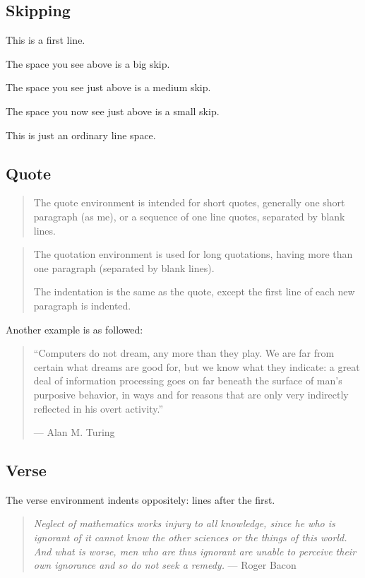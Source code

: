 \documentclass{article}
\begin{document}
\subsection{Skipping}
This is a first line. \bigskip

The space you see above is a big skip. \medskip

The space you see just above is a medium skip. \smallskip

The space you now see just above is a small skip.

This is just an ordinary line space.

\subsection{Quote}
\begin{quote}
The quote environment is intended for short quotes, generally one short
paragraph (as me), or a sequence of one line quotes, separated by blank lines.
\end{quote}
\begin{quotation}
The quotation environment is used for long quotations, having more
than one paragraph (separated by blank lines).

\noindent The indentation is the same
as the quote, except the first line of each new paragraph is indented.
\end{quotation}

Another example is as followed:
\begin{quotation}
``Computers do not dream, any more than they play. We are
far from certain what dreams are good for, but we know what
they indicate: a great deal of information processing goes on far
beneath the surface of man’s purposive behavior, in ways and
for reasons that are only very indirectly reflected in his overt
activity.''

\hfill --- Alan M. Turing
\end{quotation}

\subsection{Verse}
The verse environment indents oppositely: lines after the first.
\begin{verse}
\textit{Neglect of mathematics works injury to all knowledge, since he
who is ignorant of it cannot know the other sciences or the
things of this world. And what is worse, men who are thus
ignorant are unable to perceive their own ignorance and so do
not seek a remedy.} \hfill --- Roger Bacon
\end{verse}
\end{document}
